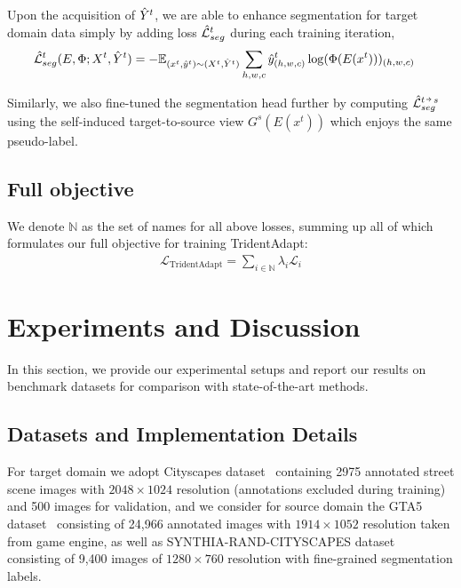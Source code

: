 \documentclass{bmvc2k}
\newcommand{\veryshortarrow}[1][3pt]{\mathrel{\hbox{\rule[\dimexpr\fontdimen22\textfont2-.2pt\relax]{#1}{.4pt}}\mkern-4mu\hbox{\usefont{U}{lasy}{m}{n}\symbol{41}}}}
\begin{document}
Upon the acquisition of ${{\Hat{{Y}}^{t}}}$, we are able to enhance segmentation for target domain data simply by adding loss ${\Hat{\mathcal{L}}^{t}_{seg}}$ during each training iteration, 
\begin{align}
    \label{eq:target_seg}
    &{\Hat{\mathcal{L}}^{t}_{seg} ( E, \Phi; {X}^{t}, \Hat{{Y}}^{t})} =  -\mathbb{E}_{({x}^{t}, \Hat{{y}}^{t})\sim({X}^{t}, \Hat{{Y}}^{t})} \sum_{h,w,c}\Hat{{y}}^{t}_{(h,w,c)}\log(\Phi({E(x^{t})}))_{(h,w,c)}
\end{align}

Similarly, we also fine-tuned the segmentation head further by computing $\hat{\mathcal{L}}_{seg}^{t\,\veryshortarrow\,s}$ using the self-induced target-to-source view $G^{s}({E(x^{t})})$ which enjoys the same pseudo-label.


\subsection{Full objective}



We denote $\mathbb{N}$ as the set of names for all above losses, summing up all of which formulates our full objective for training TridentAdapt: 
\begin{align}
    \label{eq:full_loss}
    \mathcal{L}_{\mathrm{TridentAdapt}} = \sum_{i\in\mathbb{N}} \lambda_{i}\mathcal{L}_{i}
\end{align}


\section{Experiments and Discussion}
\label{sec:experiments}
In this section, we provide our experimental setups and report our results on benchmark datasets for comparison with state-of-the-art methods. 


\subsection{Datasets and Implementation Details}
For target domain we adopt Cityscapes dataset~\cite{cordts2016cityscapes} containing 2975 annotated street scene images with $2048\times 1024$ resolution (annotations excluded during training) and 500 images for validation, and we consider for source domain the GTA5 dataset~\cite{richter2016playing} consisting of 24,966 annotated images with $1914\times 1052$ resolution taken from game engine, as well as SYNTHIA-RAND-CITYSCAPES dataset~\cite{ros2016synthia} consisting of 9,400 images of $1280\times 760$ resolution with fine-grained segmentation labels.
\end{document}
